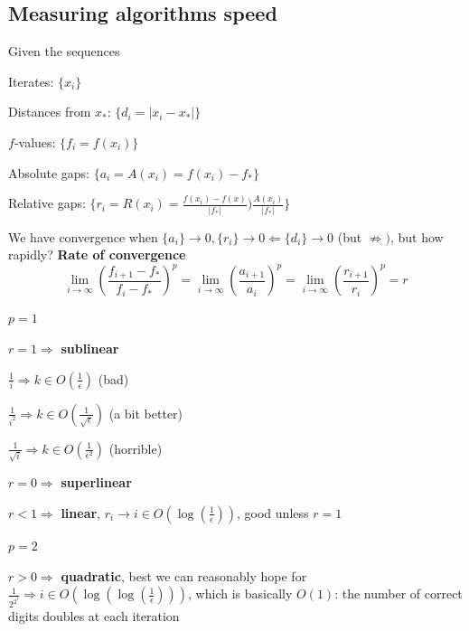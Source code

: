 \documentclass[10pt]{report}
\begin{document}
\subsection{Measuring algorithms speed} Given the sequences \begin{list}{}{}
	\item Iterates: $\{x_i\}$
	\item Distances from $x_*$: $\{d_i = |x_i - x_*|\}$
	\item $f$-values: $\{f_i = f(x_i)\}$
	\item Absolute gaps: $\{a_i = A(x_i) = f(x_i) - f_*\}$
	\item Relative gaps: $\{r_i = R(x_i) = \frac{f(x_i) - f(x)}{|f_*|} ) \frac{A(x_i)}{|f_*|}\}$
\end{list}
We have convergence when $\{a_i\} \rightarrow 0, \{r_i\} \rightarrow 0 \Leftarrow \{d_i\} \rightarrow 0$ (but $\not\Rightarrow)$, but how rapidly? \textbf{Rate of convergence}
$$\lim_{i\to\infty} \left(\frac{f_{i+1} - f_*}{f_i - f_*}\right)^p = \lim_{i\to\infty} \left(\frac{a_{i+1}}{a_i}\right)^p = \lim_{i\to\infty} \left(\frac{r_{i+1}}{r_i}\right)^p = r$$
\begin{list}{}{}
	\item[$p = 1$]\begin{list}{}{}
		\item $r = 1\Rightarrow$ \textbf{sublinear} \begin{list}{}{}
			\item $\frac{1}{i} \Rightarrow k \in O(\frac{1}{\epsilon})$ (bad)
			\item $\frac{1}{i^2} \Rightarrow k \in O(\frac{1}{\sqrt{\epsilon}})$ (a bit better)
			\item $\frac{1}{\sqrt{i}} \Rightarrow k \in O(\frac{1}{\epsilon^2})$ (horrible)
		\end{list}
		\item $r = 0\Rightarrow$ \textbf{superlinear}
		\item $r < 1\Rightarrow$ \textbf{linear}, $r_i \rightarrow i \in O(\log(\frac{1}{\epsilon}))$, good unless $r = 1$
	\end{list}
	\item[$p = 2$]\begin{list}{}{}
		\item $r > 0\Rightarrow$ \textbf{quadratic}, best we can reasonably hope for\\
	$\frac{1}{2^{2^i}} \Rightarrow i \in O(\log(\log(\frac{1}{\epsilon})))$, which is basically $O(1)$: the number of correct digits doubles at each iteration
	\end{list}
\end{list}
\end{document}
